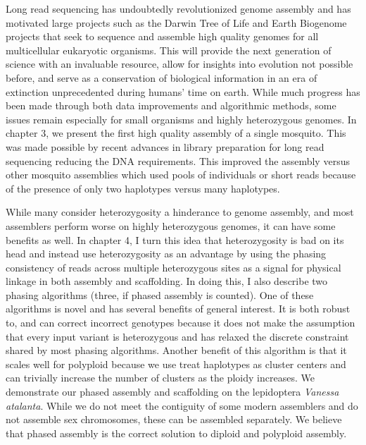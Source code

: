 \par{
Long read sequencing has undoubtedly revolutionized genome assembly and has motivated large projects such as the Darwin Tree of Life and Earth Biogenome projects that seek to sequence and assemble high quality genomes for all multicellular eukaryotic organisms. This will provide the next generation of science with an invaluable resource, allow for insights into evolution not possible before, and serve as a conservation of biological information in an era of extinction unprecedented during humans' time on earth. While much progress has been made through both data improvements and algorithmic methods, some issues remain especially for small organisms and highly heterozygous genomes. In chapter 3, we present the first high quality assembly of a single mosquito. This was made possible by recent advances in library preparation for long read sequencing reducing the DNA requirements. This improved the assembly versus other mosquito assemblies which used pools of individuals or short reads because of the presence of only two haplotypes versus many haplotypes.
}

\par{
While many consider heterozygosity a hinderance to genome assembly, and most assemblers perform worse on highly heterozygous genomes, it can have some benefits as well. In chapter 4, I turn this idea that heterozygosity is bad on its head and instead use heterozygosity as an advantage by using the phasing consistency of reads across multiple heterozygous sites as a signal for physical linkage in both assembly and scaffolding. In doing this, I also describe two phasing algorithms (three, if phased assembly is counted). One of these algorithms is novel and has several benefits of general interest. It is both robust to, and can correct incorrect genotypes because it does not make the assumption that every input variant is heterozygous and has relaxed the discrete constraint shared by most phasing algorithms. Another benefit of this algorithm is that it scales well for polyploid because we use treat haplotypes as cluster centers and can trivially increase the number of clusters as the ploidy increases. We demonstrate our phased assembly and scaffolding on the lepidoptera \textit{Vanessa atalanta}. While we do not meet the contiguity of some modern assemblers and do not assemble sex chromosomes, these can be assembled separately. We believe that phased assembly is the correct solution to diploid and polyploid assembly.
}